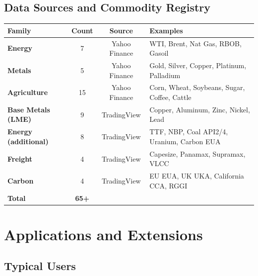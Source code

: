 \documentclass[11pt,a4paper]{article}
\renewcommand{\arraystretch}{1}
\renewcommand{\arraystretch}{1}
\renewcommand{\arraystretch}{1.45}
\begin{document}
\subsection{Data Sources and Commodity Registry}

\begin{center}
\renewcommand{\arraystretch}{1.5}
\begin{tabularx}{\textwidth}{>{\bfseries}l c c X}
\toprule
Family & Count & Source & Examples \\
\midrule
Energy              & 7  & Yahoo Finance  & WTI, Brent, Nat Gas, RBOB, Gasoil \\
Metals              & 5  & Yahoo Finance  & Gold, Silver, Copper, Platinum, Palladium \\
Agriculture         & 15 & Yahoo Finance  & Corn, Wheat, Soybeans, Sugar, Coffee, Cattle \\
Base Metals (LME)   & 9  & TradingView    & Copper, Aluminum, Zinc, Nickel, Lead \\
Energy (additional) & 8  & TradingView    & TTF, NBP, Coal API2/4, Uranium, Carbon EUA \\
Freight             & 4  & TradingView    & Capesize, Panamax, Supramax, VLCC \\
Carbon              & 4  & TradingView    & EU EUA, UK UKA, California CCA, RGGI \\
\midrule
\textbf{Total} & \textbf{65+} & & \\
\bottomrule
\end{tabularx}
\end{center}

\section{Applications and Extensions}

\subsection{Typical Users}
\end{document}
